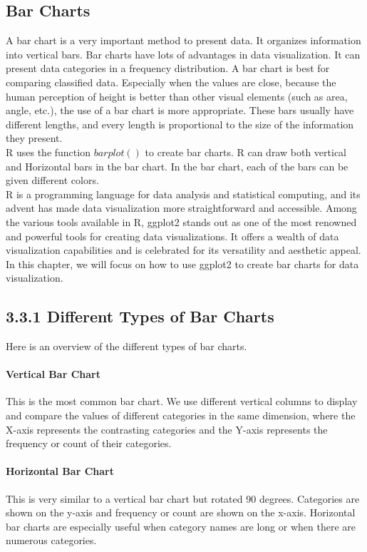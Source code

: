 \documentclass{article}\usepackage[]{graphicx}\usepackage[]{xcolor}
\begin{document}
\subsection*{Bar Charts}
A bar chart is a very important method to present data. It organizes information into vertical bars.  Bar charts have lots of advantages in data visualization. It can present data categories in a frequency distribution. A bar chart is best for comparing classified data. Especially when the values are close, because the human perception of height is better than other visual elements (such as area, angle, etc.), the use of a bar chart is more appropriate. These bars usually have different lengths, and every length is proportional to the size of the information they present.\\
R uses the function $barplot()$ to create bar charts. R can draw both vertical and Horizontal bars in the bar chart. In the bar chart, each of the bars can be given different colors.\\
R is a programming language for data analysis and statistical computing, and its advent has made data visualization more straightforward and accessible. Among the various tools available in R, ggplot2 stands out as one of the most renowned and powerful tools for creating data visualizations. It offers a wealth of data visualization capabilities and is celebrated for its versatility and aesthetic appeal. In this chapter, we will focus on how to use ggplot2 to create bar charts for data visualization.\\

\subsection*{3.3.1 Different Types of Bar Charts}
Here is an overview of the different types of bar charts. \\
\paragraph{Vertical Bar Chart}
This is the most common bar chart. We use different vertical columns to display and compare the values of different categories in the same dimension, where the X-axis represents the contrasting categories and the Y-axis represents the frequency or count of their categories.\\
\paragraph{Horizontal Bar Chart}
This is very similar to a vertical bar chart but rotated 90 degrees. Categories are shown on the y-axis and frequency or count are shown on the x-axis. Horizontal bar charts are especially useful when category names are long or when there are numerous categories.
\end{document}
